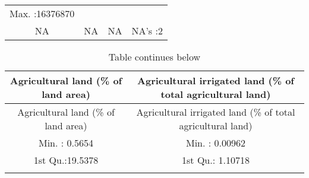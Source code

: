 \documentclass[
]{article}
\begin{document}
\begin{longtable}[]{@{}cccc@{}}
\begin{minipage}[t]{0.23\columnwidth}
Max. :16376870\strut
\end{minipage}\tabularnewline
\begin{minipage}[t]{0.22\columnwidth}\centering
NA\strut
\end{minipage} & \begin{minipage}[t]{0.22\columnwidth}\centering
NA\strut
\end{minipage} & \begin{minipage}[t]{0.22\columnwidth}\centering
NA\strut
\end{minipage} & \begin{minipage}[t]{0.23\columnwidth}\centering
NA's :2\strut
\end{minipage}\tabularnewline
\bottomrule
\end{longtable}

\begin{longtable}[]{@{}cc@{}}
\caption{Table continues below}\tabularnewline
\toprule
\begin{minipage}[b]{0.41\columnwidth}\centering
Agricultural land (\% of land area)\strut
\end{minipage} & \begin{minipage}[b]{0.43\columnwidth}\centering
Agricultural irrigated land (\% of total agricultural land)\strut
\end{minipage}\tabularnewline
\midrule
\endfirsthead
\toprule
\begin{minipage}[b]{0.41\columnwidth}\centering
Agricultural land (\% of land area)\strut
\end{minipage} & \begin{minipage}[b]{0.43\columnwidth}\centering
Agricultural irrigated land (\% of total agricultural land)\strut
\end{minipage}\tabularnewline
\midrule
\endhead
\begin{minipage}[t]{0.41\columnwidth}\centering
Min. : 0.5654\strut
\end{minipage} & \begin{minipage}[t]{0.43\columnwidth}\centering
Min. : 0.00962\strut
\end{minipage}\tabularnewline
\begin{minipage}[t]{0.41\columnwidth}\centering
1st Qu.:19.5378\strut
\end{minipage} & \begin{minipage}[t]{0.43\columnwidth}\centering
1st Qu.: 1.10718\strut
\end{minipage}\tabularnewline
\begin{minipage}[t]{0.41\columnwidth}\centering

\end{minipage}
\end{longtable}
\end{document}
